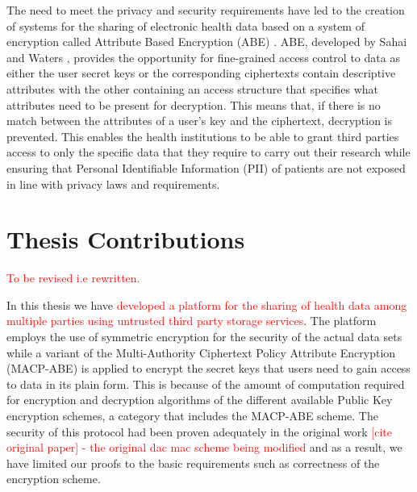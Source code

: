 The need to meet the privacy and security requirements have led to the creation of systems for the sharing of electronic health data based on a system of encryption called Attribute Based Encryption (ABE) \cite{Ibraimi2010}\cite{Narayan2010}\cite{Akinyele2010}\cite{Barua2011}\cite{Alshehri}\cite{Hupperich2012}\cite{Hsieh2012}\cite{Li2013}. ABE, developed by Sahai and Waters \cite{Sahai2005}, provides the opportunity for fine-grained access control to data as either the user secret keys or the corresponding ciphertexts contain descriptive attributes with the other containing an access structure that specifies what attributes need to be present for decryption. This means that, if there is no match between the attributes of a user's key and the ciphertext, decryption is prevented. This enables the health institutions to be able to grant third parties access to only the specific data that they require to carry out their research while ensuring that Personal Identifiable Information (PII) of patients are not exposed in line with privacy laws and requirements.


\section{Thesis Contributions}

\textcolor{red}{To be revised i.e rewritten.}

In this thesis we have \textcolor{red}{developed a platform for the sharing of health data among multiple parties using untrusted third party storage services}. The platform employs the use of symmetric encryption for the security of the actual data sets while a variant of the Multi-Authority Ciphertext Policy Attribute Encryption (MACP-ABE) is applied to encrypt the secret keys that users need to gain access to data in its plain form. This is because of the amount of computation required for encryption and decryption algorithms of the different available Public Key encryption schemes, a category that includes the MACP-ABE scheme. The security of this protocol had been proven adequately in the original work \textcolor{red}{[cite original paper] - the original dac mac scheme being modified} and as a result, we have limited our proofs to the basic requirements such as correctness of the encryption scheme.

